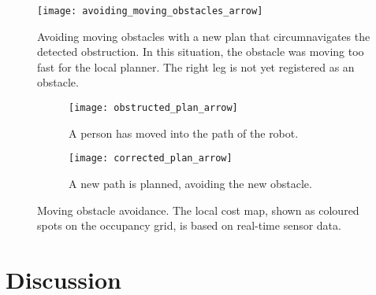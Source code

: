 \begin{figure}[p]
	\centering
	\texttt{[image: avoiding\_moving\_obstacles\_arrow]}
	\caption{Avoiding moving obstacles with a new plan that circumnavigates the detected obstruction. In this situation, the obstacle was moving too fast for the local planner. The right leg is not yet registered as an obstacle.}
	\label{fig:avoiding_moving_obstacles}
\end{figure}

\begin{figure}
	\centering
	\begin{subfigure}[b]{0.46\textwidth}
		\texttt{[image: obstructed\_plan\_arrow]}
		\caption{A person has moved into the path of the robot.}
		\label{fig:obstructed_plan}
	\end{subfigure}
	\begin{subfigure}[b]{0.472\textwidth}
		\texttt{[image: corrected\_plan\_arrow]}
		\caption{A new path is planned, avoiding the new obstacle.}
		\label{fig:corrected_plan}
	\end{subfigure}
	\caption{Moving obstacle avoidance. The local cost map, shown as coloured spots on the occupancy grid, is based on real-time sensor data. }\label{fig:obstacle_avoidance}
\end{figure}




\section{Discussion}